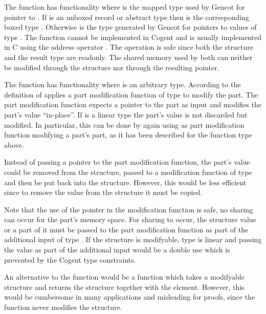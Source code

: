 The function  has functionality  where  is the mapped type used by Gencot
for pointer to . If  is an unboxed record or abstract type  then  is the
corresponding boxed type . Otherwise  is the type  generated by Gencot for pointers
to values of type . The function cannot be implemented in Cogent and is usually implemented in C using the address 
operator \code{\&}. The operation is safe since both the structure and the result type are readonly. The shared
memory used by both can neither be modified through the structure nor through the resulting pointer. 

The function  has functionality  where  is an arbitrary type.
According to the definition of   applies a part modification function of
type  to modify the part.
The part modification function expects a pointer to the part as input and modifies the part's value ``in-place''. If
 is a linear type the part's value is not discarded but modified. In particular, this can be done by
again using  as part modification function modifying a part's part, as it has been described
for the function type  above.

Instead of passing a pointer to the part modification function, the part's value could be removed from the structure,
passed to a modification function of type  and then be put back into the structure. However, this
would be less efficient since to remove the value from the structure it must be copied.

Note that the use of the pointer in the modification function is safe, no sharing can occur for the part's memory
space. For sharing to occur, the structure value or a part of it must be passed to the part modification function as
part of the additional input of type . If the structure is modifyable, type  is linear and passing 
the value as part of the additional input would be a double use which is prevented by the Cogent type constraints.

An alternative to the function  would be a function which takes a modifyable structure and returns the structure
together with the element. However, this would be cumbersome in many applications and misleading for proofs, since 
the function never modifies the structure. 

